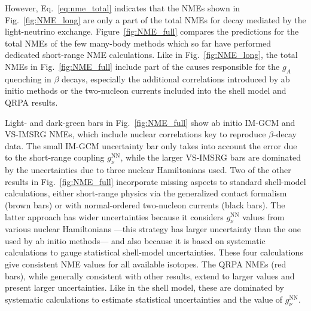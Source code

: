 However, Eq.~\eqref{eq:nme_total} indicates that the NMEs shown in Fig.~\ref{fig:NME_long} are only a part of the total NMEs for \bbonu decay mediated by the light-neutrino exchange. Figure~\ref{fig:NME_full} compares the predictions for the total NMEs of the few many-body methods which so far have performed dedicated short-range NME calculations. Like in Fig.~\ref{fig:NME_long}, the total NMEs in Fig.~\ref{fig:NME_full} include part of the causes responsible for the $g_A$ quenching in $\beta$ decays, especially the additional correlations introduced by ab initio methods or the two-nucleon currents included into the shell model and QRPA results.

Light- and dark-green bars in Fig.~\ref{fig:NME_full} show ab initio IM-GCM and VS-IMSRG NMEs, which include nuclear correlations key to reproduce $\beta$-decay data. The small IM-GCM uncertainty bar only takes into account the error due to the short-range coupling $g^{\text{NN}}_\nu$, while the larger VS-IMSRG bars are dominated by the uncertainties due to three nuclear Hamiltonians used. Two of the other results in Fig.~\ref{fig:NME_full} incorporate missing aspects to standard shell-model calculations, either short-range physics via the generalized contact formalism (brown bars) or with normal-ordered two-nucleon currents (black bars). The latter approach has wider uncertainties because it considers $g^{\text{NN}}_\nu$ values from various nuclear Hamiltonians ---this strategy has larger uncertainty than the one used by ab initio methods--- and also because it is based on systematic calculations to gauge statistical shell-model uncertainties. These four calculations give consistent NME values for all available isotopes. The QRPA NMEs (red bars), while generally consistent with other results, extend to larger values and present larger uncertainties. Like in the shell model, these are dominated by systematic calculations to estimate statistical uncertainties and the value of $g^{\text{NN}}_\nu$.


